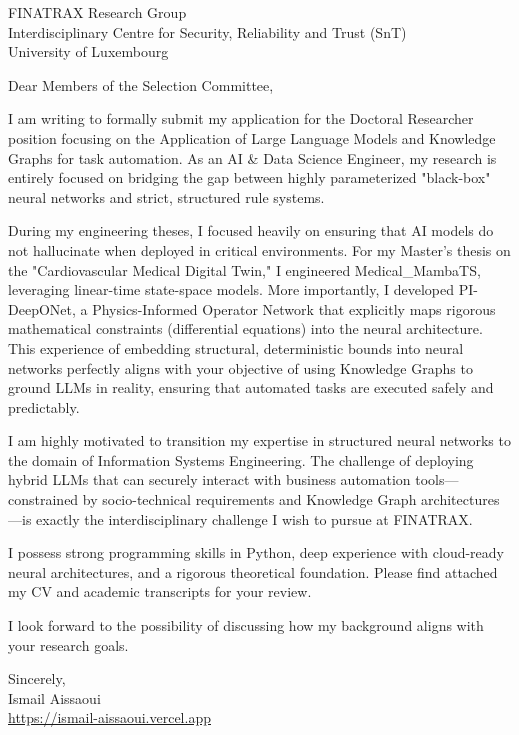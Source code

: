 \documentclass[11pt, a4paper]{letter}
\begin{document}
\begin{letter}{FINATRAX Research Group \\ Interdisciplinary Centre for Security, Reliability and Trust (SnT) \\ University of Luxembourg}
\opening{Dear Members of the Selection Committee,}

I am writing to formally submit my application for the Doctoral Researcher position focusing on the Application of Large Language Models and Knowledge Graphs for task automation. As an AI \& Data Science Engineer, my research is entirely focused on bridging the gap between highly parameterized "black-box" neural networks and strict, structured rule systems.

During my engineering theses, I focused heavily on ensuring that AI models do not hallucinate when deployed in critical environments. For my Master's thesis on the "Cardiovascular Medical Digital Twin," I engineered Medical\_MambaTS, leveraging linear-time state-space models. More importantly, I developed PI-DeepONet, a Physics-Informed Operator Network that explicitly maps rigorous mathematical constraints (differential equations) into the neural architecture. This experience of embedding structural, deterministic bounds into neural networks perfectly aligns with your objective of using Knowledge Graphs to ground LLMs in reality, ensuring that automated tasks are executed safely and predictably.

I am highly motivated to transition my expertise in structured neural networks to the domain of Information Systems Engineering. The challenge of deploying hybrid LLMs that can securely interact with business automation tools—constrained by socio-technical requirements and Knowledge Graph architectures—is exactly the interdisciplinary challenge I wish to pursue at FINATRAX.

I possess strong programming skills in Python, deep experience with cloud-ready neural architectures, and a rigorous theoretical foundation. Please find attached my CV and academic transcripts for your review.

I look forward to the possibility of discussing how my background aligns with your research goals.

\closing{Sincerely, \\ Ismail Aissaoui \\ \href{https://ismail-aissaoui.vercel.app}{https://ismail-aissaoui.vercel.app}}
\end{letter}
\end{document}
